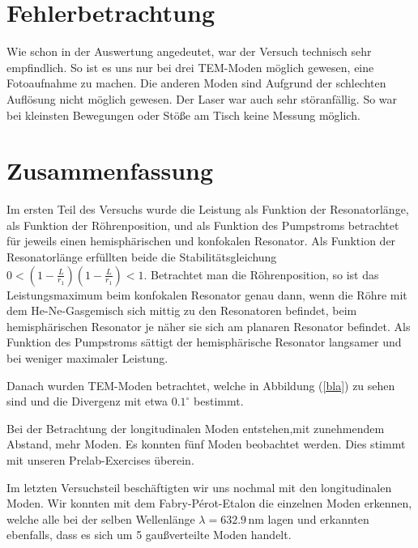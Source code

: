 \documentclass[10pt,twoside]{article}
\renewcommand{\1}{^{-1}}
\renewcommand{\2}{^{-2}}
\newcommand{\3}{^{-3}}
\newcommand{\4}{^{-4}}
\newcommand{\5}{^{-5}}
\newcommand{\6}{^{-6}}
\newcommand{\7}{^{-7}}
\newcommand{\8}{^{-8}}
\newcommand{\9}{^{-9}}
\begin{document}
\section{Fehlerbetrachtung}

Wie schon in der Auswertung angedeutet, war der Versuch technisch sehr empfindlich. So ist es uns nur bei drei TEM-Moden möglich gewesen, eine Fotoaufnahme zu machen. Die anderen Moden sind Aufgrund der schlechten Auflösung nicht möglich gewesen.
Der Laser war auch sehr störanfällig. So war bei kleinsten Bewegungen oder Stöße am Tisch keine Messung möglich.

\section{Zusammenfassung}

Im ersten Teil des Versuchs wurde die Leistung als Funktion der Resonatorlänge, als Funktion der Röhrenposition, und als Funktion des Pumpstroms betrachtet für jeweils einen hemisphärischen und konfokalen Resonator. Als Funktion der Resonatorlänge erfüllten beide die Stabilitätsgleichung $0<(1-\frac{L}{r_1})(1-\frac{L}{r_1})<1$. Betrachtet man die Röhrenposition, so ist das Leistungsmaximum beim konfokalen Resonator genau dann, wenn die Röhre mit dem He-Ne-Gasgemisch sich mittig zu den Resonatoren befindet, beim hemisphärischen Resonator je näher sie sich am planaren Resonator befindet. Als Funktion des Pumpstroms sättigt der hemisphärische Resonator langsamer und bei weniger maximaler Leistung.

Danach wurden TEM-Moden betrachtet, welche in Abbildung (\ref{bla}) zu sehen sind und die Divergenz mit etwa $0.1^{\circ}$ bestimmt.

Bei der Betrachtung der longitudinalen Moden entstehen,mit zunehmendem Abstand, mehr Moden. Es konnten fünf Moden beobachtet werden. Dies stimmt mit unseren Prelab-Exercises überein.

Im letzten Versuchsteil beschäftigten wir uns nochmal mit den longitudinalen Moden. Wir konnten mit dem Fabry-Pérot-Etalon die einzelnen Moden erkennen, welche alle bei der selben Wellenlänge $\lambda=632.9$\,nm lagen und erkannten ebenfalls, dass es sich um 5 gaußverteilte Moden handelt.
\end{document}
